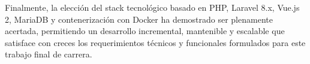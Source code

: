 Finalmente, la elección del stack tecnológico basado en PHP, Laravel 8.x, Vue.js 2, MariaDB y contenerización con Docker ha demostrado ser plenamente acertada, permitiendo un desarrollo incremental, mantenible y escalable que satisface con creces los requerimientos técnicos y funcionales formulados para este trabajo final de carrera.
